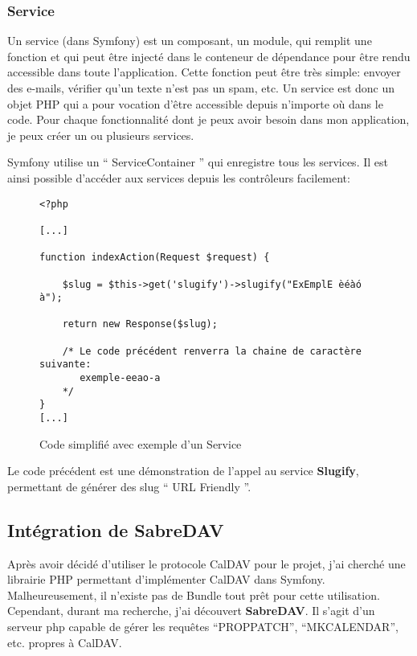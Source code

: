 \subsubsection*{Service}

Un service (dans Symfony) est un composant, un module, qui remplit une fonction et qui peut être injecté dans le conteneur de dépendance pour être rendu accessible dans toute l'application. Cette fonction peut être très simple: envoyer des e-mails, vérifier qu'un texte n'est pas un spam, etc. Un service est donc un objet PHP qui a pour vocation d'être accessible depuis n'importe où dans le code. Pour chaque fonctionnalité dont je peux avoir besoin dans mon application, je peux créer un ou plusieurs services.

Symfony utilise un `` ServiceContainer '' qui enregistre tous les services. Il est ainsi possible d'accéder aux services depuis les contrôleurs facilement:

\begin{figure}[H]
\begin{lstlisting}[frame=single]
<?php

[...]

function indexAction(Request $request) {

    $slug = $this->get('slugify')->slugify("ExEmplE èéàó à");

    return new Response($slug);

    /* Le code précédent renverra la chaine de caractère suivante:
       exemple-eeao-a
    */
}
[...]

\end{lstlisting}
\caption{Code simplifié avec exemple d'un Service}
\end{figure}

Le code précédent est une démonstration de l'appel au service \textbf{Slugify}, permettant de générer des slug `` URL Friendly ''.

\subsection{Intégration de SabreDAV}

Après avoir décidé d'utiliser le protocole CalDAV pour le projet, j'ai cherché une librairie PHP permettant d'implémenter CalDAV dans Symfony. Malheureusement, il n'existe pas de Bundle tout prêt pour cette utilisation. Cependant, durant ma recherche, j'ai découvert \textbf{SabreDAV}. Il s'agit d'un serveur php capable de gérer les requêtes ``PROPPATCH'', ``MKCALENDAR'', etc. propres à CalDAV.

